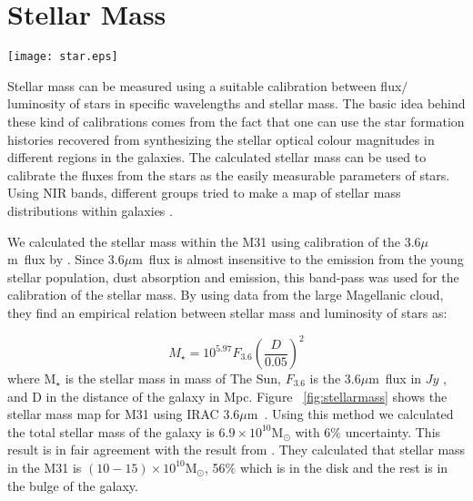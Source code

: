 \documentclass[useAMS,usenatbib]{mn2e}
\newcommand \um    {$\mu$m\ }
\begin{document}
\section{Stellar Mass}
\label{sec:starmass}
\begin{figure*}
\centering
\texttt{[image: star.eps]}
\caption{Stellar Mass surface density. This mass is produced using $IRAC$ 3.6 $\mu$ m data and its calibration presented in equation ~\ref{equ:eskew}}
\label{fig:stellarmass}
\end{figure*}

Stellar mass can be measured using a suitable calibration between flux$/$luminosity of stars in specific wavelengths and stellar mass. The basic idea behind these kind of calibrations comes from the fact that one can use the star formation histories recovered from synthesizing the stellar optical colour magnitudes in different regions in the galaxies. The calculated stellar mass can be used  to calibrate the fluxes from the stars as the easily measurable parameters of stars. Using NIR bands, different groups tried to make a map of stellar mass distributions within galaxies \citep[e.g.,][]{Elmgreen84}.%

We calculated the stellar mass within the M31 using calibration of the 3.6\um flux by \cite{Eskew12}.  Since 3.6\um flux is almost insensitive to the emission from the young stellar population, dust absorption and emission, this band-pass was used for the calibration of the stellar mass. By using data from the large Magellanic cloud, they find an empirical relation between stellar mass and luminosity of stars as:

\begin{equation}
\label{equ:eskew}
M _{\star}= 10^{5.97} F_{3.6}(\frac{D}{0.05})^2
\end{equation}
where M$_{\star}$ is the stellar mass in mass of The Sun, $F_{3.6}$ is the 3.6\um flux in $Jy$ , and D in the distance of the galaxy in Mpc. Figure ~\ref{fig:stellarmass} shows the stellar mass map for M31 using IRAC 3.6\um. Using this method we calculated the total stellar mass of the galaxy is $6.9 \times 10^{10}$M$_{\odot}$ with 6$\%$ uncertainty. This result is in fair agreement with the result from \cite{Tamm12}. They calculated that stellar mass in the M31 is $(10-15) \times 10^{10}$M$_{\odot}$, 56$\%$ which is in the disk and the rest is in the bulge of the galaxy.   %
\end{document}
